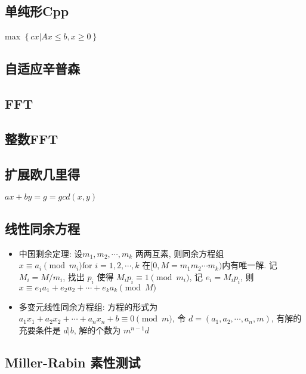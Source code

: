 \documentclass[landscape, twocolumn, 8pt, a4paper, twoside]{extarticle}
\begin{document}
\subsection{单纯形Cpp}
max $\left \{ cx | Ax \le b, x \ge 0 \right \}$


\subsection{自适应辛普森}


\subsection{FFT}


\subsection{整数FFT}


\subsection{扩展欧几里得}
$ax + by = g = gcd(x, y)$


\subsection{线性同余方程}
\begin{itemize}
\item 中国剩余定理:
  设$m_1, m_2, \cdots, m_k$ 两两互素, 则同余方程组 $x \equiv a_i \pmod{m_i} \textrm{for $i = 1, 2, \cdots, k$}$
  在$[0, M = m_1 m_2 \cdots m_k)$内有唯一解. 
  记 $M_i = M / m_i$,
  找出 $p_i$ 使得 $M_i p_i \equiv 1 \pmod{m_i}$,
  记 $e_i = M_i p_i$,
  则 $x \equiv e_1 a_1 + e_2 a_2 + \cdots + e_k a_k \pmod{M}$
\item 多变元线性同余方程组:
  方程的形式为 $a_1 x_1 + a_2 x_2 + \cdots + a_n x_n + b \equiv 0 \pmod{m}$,
  令 $d = (a_1, a_2, \cdots, a_n, m)$,
  有解的充要条件是 $d | b$, 解的个数为 $m^{n - 1} d$
\end{itemize}

\subsection{Miller-Rabin 素性测试}

\end{document}
